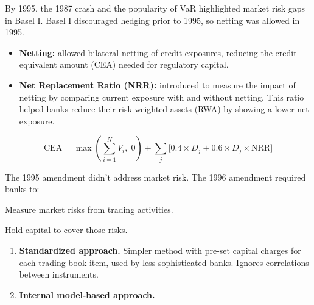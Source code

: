 
By 1995, the 1987 crash and the popularity of VaR highlighted market risk gaps in
Basel I. Basel I discouraged hedging prior to 1995, so netting was allowed in 1995.

\begin{itemize}
\item \textbf{Netting:} allowed bilateral netting of credit exposures, reducing the
credit equivalent amount (CEA) needed for regulatory capital.
\item \textbf{Net Replacement Ratio (NRR):} introduced to measure the impact of
netting by comparing current exposure with and without netting. This ratio helped
banks reduce their risk-weighted assets (RWA) by showing a lower net exposure.
\end{itemize}

\begin{orkeybox}
\[
\mathrm{CEA}=\max\!\left(\sum_{i=1}^{N}V_i,\;0\right)
 +\sum_{j}\bigl[0.4\times D_j + 0.6\times D_j \times \mathrm{NRR}\bigr]
\]
\end{orkeybox}


The 1995 amendment didn't address market risk. The 1996 amendment required banks
to:

\begin{lettered}
\item Measure market risks from trading activities.
\item Hold capital to cover those risks.
\end{lettered}


\begin{enumerate}
\item[\textcolor{rust}{\sffamily\bfseries 1)}] \textbf{Standardized approach.}
Simpler method with pre-set capital charges for each trading book item, used by
less sophisticated banks. Ignores correlations between instruments.
\item[\textcolor{rust}{\sffamily\bfseries 2)}] \textbf{Internal model-based
approach.}
\end{enumerate}

